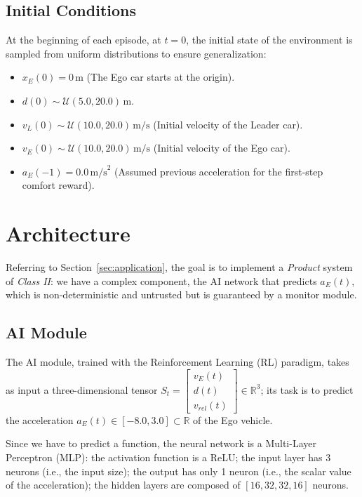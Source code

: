 \subsection{Initial Conditions}
At the beginning of each episode, at $t=0$, the initial state of the environment is sampled from uniform distributions to ensure generalization:
\begin{itemize}
    \item $x_E(0) = 0\,\text{m}$ (The Ego car starts at the origin).
    \item $d(0) \sim \mathcal{U}(5.0,20.0)\,\text{m}$.
    \item $v_L(0) \sim \mathcal{U}(10.0, 20.0)\,\text{m/s}$ (Initial velocity of the Leader car).
    \item $v_E(0) \sim \mathcal{U}(10.0, 20.0)\,\text{m/s}$ (Initial velocity of the Ego car).
    \item $a_E(-1) = 0.0\,\text{m/s}^2$ (Assumed previous acceleration for the first-step comfort reward).
\end{itemize}

\section{Architecture}
Referring to Section~\ref{sec:application}, the goal is to implement a \textit{Product} system of \textit{Class II}: we have a complex component, the AI network that predicts $a_E(t)$, which is non-deterministic and untrusted but is guaranteed by a monitor module.

\subsection{AI Module}
The AI module, trained with the Reinforcement Learning (RL) paradigm, takes as input a three-dimensional tensor $\displaystyle S_t = \begin{bmatrix} v_E(t) \\ d(t) \\ v_{rel}(t) \end{bmatrix} \in \mathbb{R}^3$; its task is to predict the acceleration $a_E(t)\in[-8.0,3.0]\subset\mathbb{R}$ of the Ego vehicle.

Since we have to predict a function, the neural network is a Multi-Layer Perceptron (MLP): the activation function is a ReLU; the input layer has 3 neurons (i.e., the input size); the output has only 1 neuron (i.e., the scalar value of the acceleration); the hidden layers are composed of $[16,32,32,16]$ neurons.

